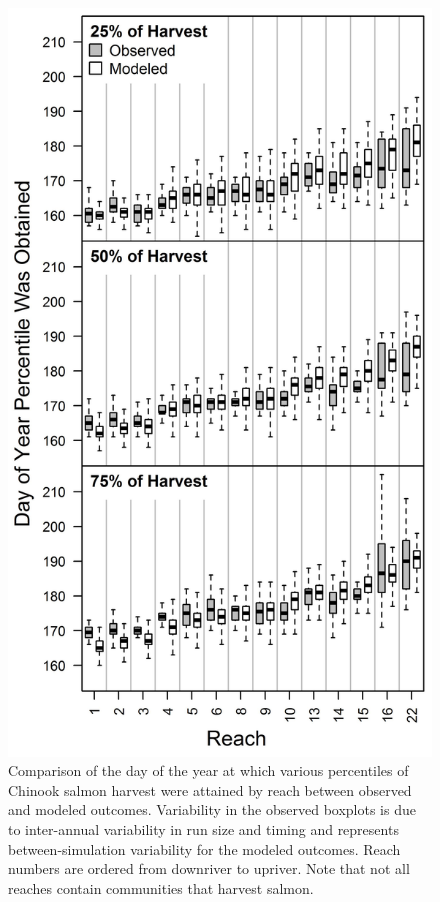 \documentclass[12pt,]{book}
\theoremstyle{definition}
\theoremstyle{definition}
\theoremstyle{definition}
\theoremstyle{remark}
\begin{document}
\clearpage

\begin{figure}
  \centering
  \includegraphics{img/Ch3/Figure B3.jpg}
  \caption{Comparison of the day of the year at which various percentiles of Chinook salmon harvest were attained by reach between observed and modeled outcomes. Variability in the observed boxplots is due to inter-annual variability in run size and timing and represents between-simulation variability for the modeled outcomes. Reach numbers are ordered from downriver to upriver. Note that not all reaches contain communities that harvest salmon.}
  \label{fig:temporal-harvest}
\end{figure}
\end{document}
